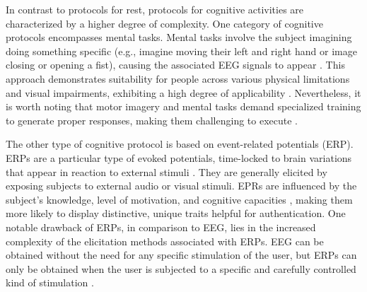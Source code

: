 In contrast to protocols for rest, protocols for cognitive activities are characterized by a higher degree of complexity. One category of cognitive protocols encompasses mental tasks. Mental tasks involve the subject imagining doing something specific (e.g., imagine moving their left and right hand or image closing or opening a fist), causing the associated EEG signals to appear \cite{survey_brain_biometrics}. This approach demonstrates suitability for people across various physical limitations and visual impairments, exhibiting a high degree of applicability \cite{zhang2021review}. Nevertheless, it is worth noting that motor imagery and mental tasks demand specialized training to generate proper responses, making them challenging to execute \cite{brigham2010subject}.
\smallskip

The other type of cognitive protocol is based on event-related potentials (ERP). ERPs are a particular type of evoked potentials, time-locked to brain variations that appear in reaction to external stimuli \cite{zhang2021review}. They are generally elicited by exposing subjects to external audio or visual stimuli. EPRs are influenced by the subject's knowledge, level of motivation, and cognitive capacities \cite{blackwood1990cognitive}, making them more likely to display distinctive, unique traits helpful for authentication. One notable drawback of ERPs, in comparison to EEG, lies in the increased complexity of the elicitation methods associated with ERPs. EEG can be obtained without the need for any specific stimulation of the user, but ERPs can only be obtained when the user is subjected to a specific and carefully controlled kind of stimulation \cite{survey_brain_biometrics}.




